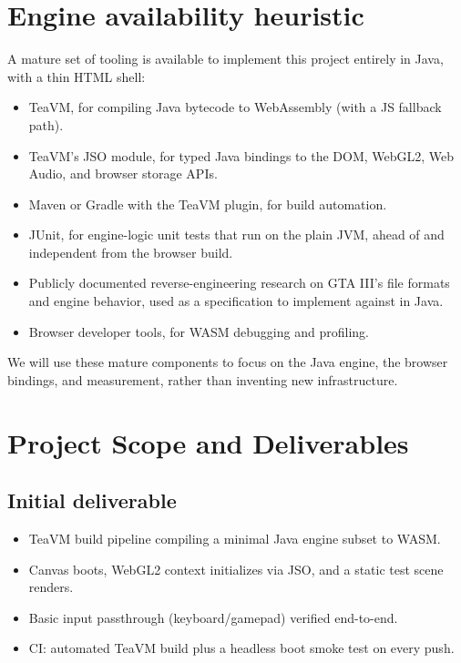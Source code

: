 \documentclass[11pt]{article}
\begin{document}
\section{Engine availability heuristic}
A mature set of tooling is available to implement this project entirely in Java, with a thin HTML shell:
\begin{itemize}[itemsep=2pt]
  \item TeaVM, for compiling Java bytecode to WebAssembly (with a JS fallback path).
  \item TeaVM's JSO module, for typed Java bindings to the DOM, WebGL2, Web Audio, and browser storage APIs.
  \item Maven or Gradle with the TeaVM plugin, for build automation.
  \item JUnit, for engine-logic unit tests that run on the plain JVM, ahead of and independent from the browser build.
  \item Publicly documented reverse-engineering research on GTA III's file formats and engine behavior, used as a specification to implement against in Java.
  \item Browser developer tools, for WASM debugging and profiling.
\end{itemize}
We will use these mature components to focus on the Java engine, the browser bindings, and measurement, rather than inventing new infrastructure.

\section{Project Scope and Deliverables}

\subsection{Initial deliverable}
\begin{itemize}[itemsep=2pt]
  \item TeaVM build pipeline compiling a minimal Java engine subset to WASM.
  \item Canvas boots, WebGL2 context initializes via JSO, and a static test scene renders.
  \item Basic input passthrough (keyboard/gamepad) verified end-to-end.
  \item CI: automated TeaVM build plus a headless boot smoke test on every push.
\end{itemize}
\end{document}
